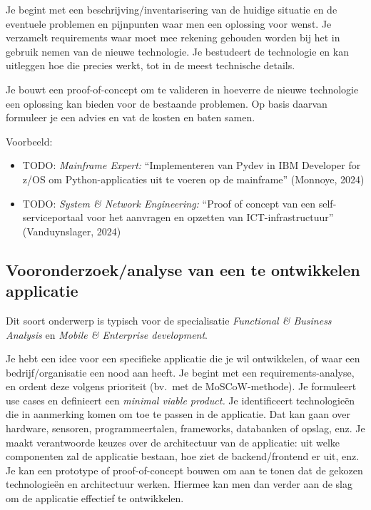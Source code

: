 Je begint met een beschrijving/inventarisering van de huidige situatie en de eventuele problemen en pijnpunten waar men een oplossing voor wenst. Je verzamelt requirements waar moet mee rekening gehouden worden bij het in gebruik nemen van de nieuwe technologie. Je bestudeert de technologie en kan uitleggen hoe die precies werkt, tot in de meest technische details.

Je bouwt een proof-of-concept om te valideren in hoeverre de nieuwe technologie een oplossing kan bieden voor de bestaande problemen. Op basis daarvan formuleer je een advies en vat de kosten en baten samen.

Voorbeeld:

\begin{itemize}
  \item TODO: \emph{Mainframe Expert:} ``Implementeren van Pydev in IBM Developer for z/OS om Python-applicaties uit te voeren op de mainframe'' (Monnoye, 2024)
  \item TODO: \emph{System \& Network Engineering:} ``Proof of concept van een self-ser\-vice\-por\-taal voor het aanvragen en opzetten van ICT-in\-fra\-struc\-tuur'' (Vanduynslager, 2024)
\end{itemize}

\subsection{Vooronderzoek/analyse van een te ontwikkelen applicatie}%
\label{ssec:onderwerp_types_vooronderzoek_analyse}

Dit soort onderwerp is typisch voor de specialisatie \emph{Functional \& Business Analysis} en \emph{Mobile \& Enterprise development}.

Je hebt een idee voor een specifieke applicatie die je wil ontwikkelen, of waar een bedrijf/organisatie een nood aan heeft. Je begint met een requirements-analyse, en ordent deze volgens prioriteit (bv.\ met de MoSCoW-methode). Je formuleert use cases en definieert een \emph{minimal viable product.} Je identificeert technologieën die in aanmerking komen om toe te passen in de applicatie. Dat kan gaan over hardware, sensoren, programmeertalen, frameworks, databanken of opslag, enz. Je maakt verantwoorde keuzes over de architectuur van de applicatie: uit welke componenten zal de applicatie bestaan, hoe ziet de backend/frontend er uit, enz. Je kan een prototype of proof-of-concept bouwen om aan te tonen dat de gekozen technologieën en architectuur werken. Hiermee kan men dan verder aan de slag om de applicatie effectief te ontwikkelen.

